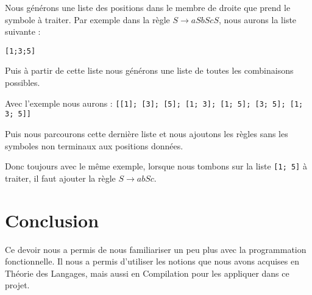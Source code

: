 \documentclass[11pt,a4paper]{article}
\def\code#1{\texttt{#1}} %
\begin{document}
Nous générons une liste des positions dans le membre de droite que prend le symbole à traiter.
Par exemple dans la règle $S \rightarrow aSbScS$, nous aurons la liste suivante :

\code{[1;3;5]}

Puis à partir de cette liste nous générons une liste de toutes les combinaisons possibles.

Avec l'exemple nous aurons : \code{[[1]; [3]; [5]; [1; 3]; [1; 5]; [3; 5]; [1; 3; 5]]}

Puis nous parcourons cette dernière liste et nous ajoutons les règles sans les symboles
non terminaux aux positions données.

Donc toujours avec le même exemple, lorsque nous tombons sur la liste \code{[1; 5]} à traiter, il faut ajouter
la règle $S \rightarrow abSc $.
\newpage

\section{Conclusion}
Ce devoir nous a permis de nous familiariser un peu plus avec la
programmation fonctionnelle. Il nous a permis d'utiliser les notions que nous
avons acquises en Théorie des Langages, mais aussi en Compilation pour les appliquer
dans ce projet.
\end{document}
